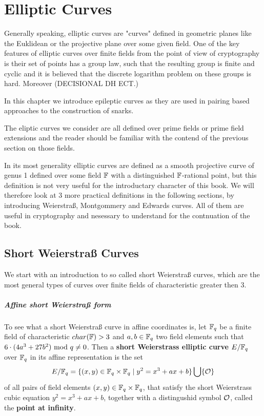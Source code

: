 \chapter{Elliptic Curves}
Generally speaking, elliptic curves are "curves" defined in geometric planes like the Euklidean or the projective plane over some given field. One of the key features of elliptic curves over finite fields from the point of view of cryptography is their set of points has a group law, such that the resulting group is finite and cyclic and it is believed that the discrete logarithm problem on these groups is hard. Moreover (DECISIONAL DH ECT.)

In this chapter we introduce epileptic curves as they are used in pairing based approaches to the construction of snarks. 

The eliptic curves we consider are all defined over prime fields or prime field extensions and the reader should be familiar with the contend of the previous section on those fields.

In its most generality elliptic curves are defined as a smooth projective curve of genus 1 defined over some field $\mathbb{F}$ with a distinguished $\mathbb{F}$-rational point, but this definition is not very useful for the introductary character of this book. We will therefore look at $3$ more practical definitions in the following sections, by introducing Weierstraß, Montgommery and Edwards curves. All of them are useful in cryptography and nesessary to understand for the contnuation of the book.

\section{Short Weierstraß Curves}
We start with an introduction to so called short Weierstraß curves, which are the most general types of curves over finite fields of characteristic greater then $3$. 

\paragraph{Affine short Weierstraß form}
To see what a short Weierstraß curve in affine coordinates is, let $\mathbb{F}_q$ be a finite field of characteristic $char(\mathbb{F})> 3$ and $a,b\in \mathbb{F}_q$ two field elements such that $6\cdot(4a^3+ 27b^2) \text{ mod } q\neq 0$. Then a \textbf{short Weierstrass elliptic curve} $E/\mathbb{F}_q$ over $\mathbb{F}_q$ in its affine representation is the set
\begin{equation}
\label{def_short_weierstrass_curve}
E/\mathbb{F}_q = \{(x,y)\in \mathbb{F}_q\times \mathbb{F}_q\;|\; y^2=x^3+ax+b \} \bigcup \{\mathcal{O}\}
\end{equation}
of all pairs of field elements $(x,y)\in \mathbb{F}_q\times \mathbb{F}_q$, that satisfy the short Weierstrass cubic equation $y^2=x^3+ax+b$, together with a distingushid symbol $\mathcal{O}$, called the \textbf{point at infinity}.

